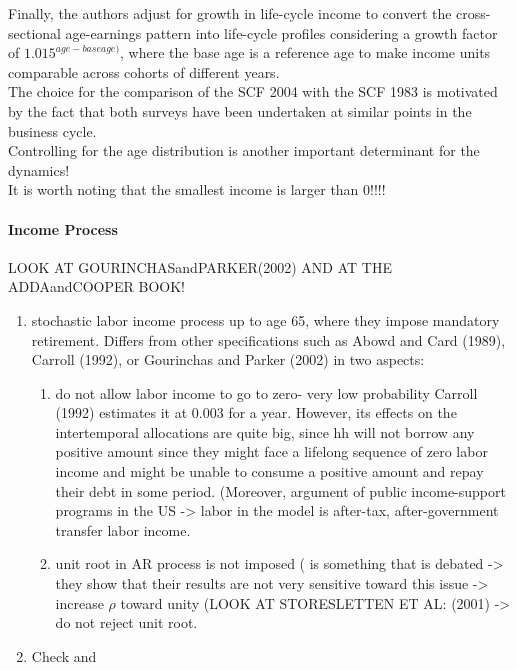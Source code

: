 \documentclass[a4paper,12pt]{article}
\begin{document}
Finally, the authors adjust for growth in life-cycle income to convert the cross-sectional age-earnings pattern into life-cycle profiles considering a growth factor of $1.015^{age-base age)}$, where the base age is a reference age to make income units comparable across cohorts of different years. \\

The choice for the comparison of the SCF 2004 with the SCF 1983 is motivated by the fact that both surveys have been undertaken at similar points in the business cycle. \\ 

Controlling for the age distribution is another important determinant for the dynamics! \\

It is worth noting that the smallest income is larger than 0!!!! 

\paragraph{Income Process}

LOOK AT GOURINCHASandPARKER(2002) AND AT THE ADDAandCOOPER BOOK! 

\begin{enumerate}
\item \citep{FV&K2011} stochastic labor income process up to age 65, where they impose mandatory retirement. Differs from other specifications such as Abowd and Card (1989), Carroll (1992), or Gourinchas and Parker (2002) in two aspects: 
\begin{enumerate}
\item do not allow labor income to go to zero- very low probability Carroll (1992) estimates it at 0.003 for a year. However, its effects on the intertemporal allocations are quite big, since hh will not borrow any positive amount since they might face a lifelong sequence of zero labor income and might be unable to consume a positive amount and repay their debt in some period. (Moreover, argument of public income-support programs in the US -> labor in the model is after-tax, after-government transfer labor income.
\item unit root in AR process is not imposed  ( is something that is debated -> they show that their results are not very sensitive toward this issue -> increase $\rho$ toward unity (LOOK AT STORESLETTEN ET AL: (2001) -> do not reject unit root.
\end{enumerate} 
\item Check \cite{hintermaier2010} and \cite{hintermaier2011}
\end{enumerate}
\end{document}
